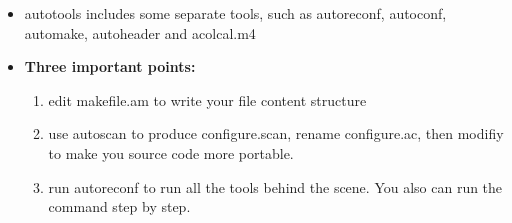 \documentclass[a4paper,12pt,twoside]{book}
\begin{document}
\begin{itemize}
		\item autotools includes some separate tools, such as autoreconf, autoconf, automake, autoheader and acolcal.m4 
		
		\item \textbf{Three important points:}
				\begin{enumerate}
						\item edit makefile.am to write your file content structure
						\item use autoscan to produce configure.scan, rename configure.ac, then modifiy to make you source code more portable. 
						
						\item run autoreconf to run all the tools behind the scene. You also can run the command step by step.
				\end{enumerate}
		

\end{itemize}
\end{document}
